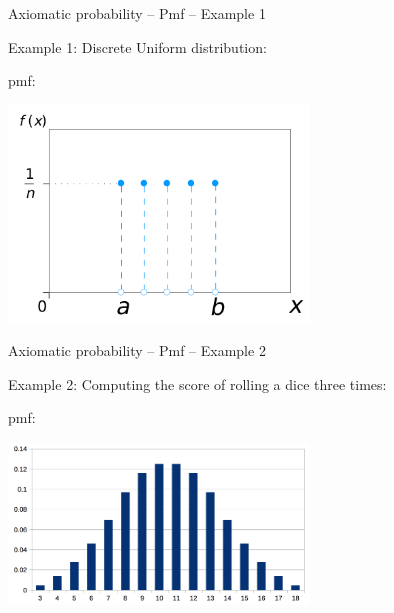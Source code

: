 \documentclass{beamer}
\begin{document}
\begin{frame}
{\centerline{Axiomatic probability -- Pmf -- Example 1}}
Example 1: Discrete Uniform distribution:

pmf:
\begin{center}
\includegraphics[width=8cm]{A2022.FondamentiStatistica/Uniform_discrete_pmf_svg_svg.png}
\end{center} 

\end{frame}

\begin{frame}
{\centerline{Axiomatic probability -- Pmf -- Example 2}}
Example 2: Computing the score of rolling a dice three times:

pmf:
\begin{center}
\includegraphics[width=8cm]{A2022.FondamentiStatistica/RollingADiceThreeTimes.png}
\end{center} 

\end{frame}
\end{document}
